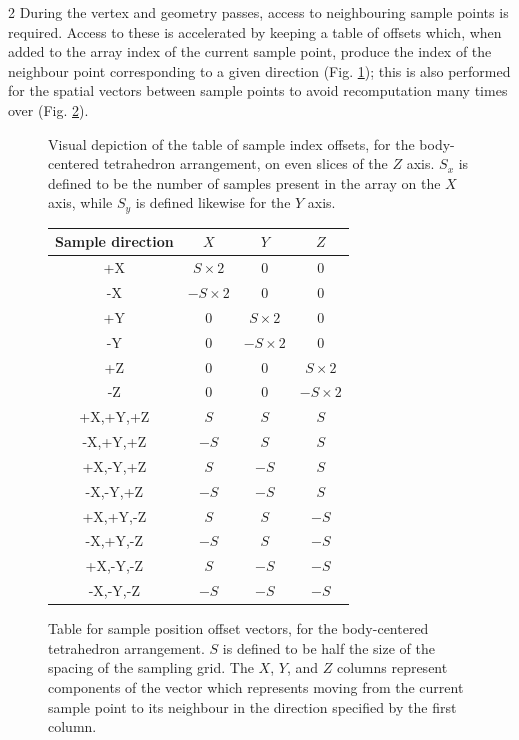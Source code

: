 \documentclass[]{article}
\begin{document}
\begin{multicols}{2}
During the vertex and geometry passes, access to neighbouring sample points is required. Access to these is accelerated by keeping a table of offsets which, when added to the array index of the current sample point, produce the index of the neighbour point corresponding to a given direction (Fig. \ref{fig:samprel}); this is also performed for the spatial vectors between sample points to avoid recomputation many times over (Fig. \ref{fig:samprelvec}).

\end{multicols}
\begin{figure}[htb]
    \centering
    
    \caption{Visual depiction of the table of sample index offsets, for the body-centered tetrahedron arrangement, on even slices of the $Z$ axis. $S_x$ is defined to be the number of samples present in the array on the $X$ axis, while $S_y$ is defined likewise for the $Y$ axis.}
    \label{fig:samprel}
\end{figure}

\begin{figure}[htb]
    \centering
    \begin{center}
\begin{tabular}{ |c|c|c|c| } 
\hline
Sample direction & $X$ & $Y$ & $Z$ \\
\hline
+X & $S\times 2$ & $0$ & $0$ \\
-X & $-S\times 2$ & $0$ & $0$ \\
+Y & $0$ & $S\times 2$ & $0$ \\
-Y & $0$ & $-S\times 2$ & $0$ \\
+Z & $0$ & $0$ & $S\times 2$ \\
-Z & $0$ & $0$ & $-S\times 2$ \\
+X,+Y,+Z & $S$ & $S$ & $S$ \\
-X,+Y,+Z & $-S$ & $S$ & $S$ \\
+X,-Y,+Z & $S$ & $-S$ & $S$ \\
-X,-Y,+Z & $-S$ & $-S$ & $S$ \\
+X,+Y,-Z & $S$ & $S$ & $-S$ \\
-X,+Y,-Z & $-S$ & $S$ & $-S$ \\
+X,-Y,-Z & $S$ & $-S$ & $-S$ \\
-X,-Y,-Z & $-S$ & $-S$ & $-S$ \\
 \hline
\end{tabular}
\end{center}
    \caption{Table for sample position offset vectors, for the body-centered tetrahedron arrangement. $S$ is defined to be half the size of the spacing of the sampling grid. The $X$, $Y$, and $Z$ columns represent components of the vector which represents moving from the current sample point to its neighbour in the direction specified by the first column.}
    \label{fig:samprelvec}
\end{figure}
\end{document}
